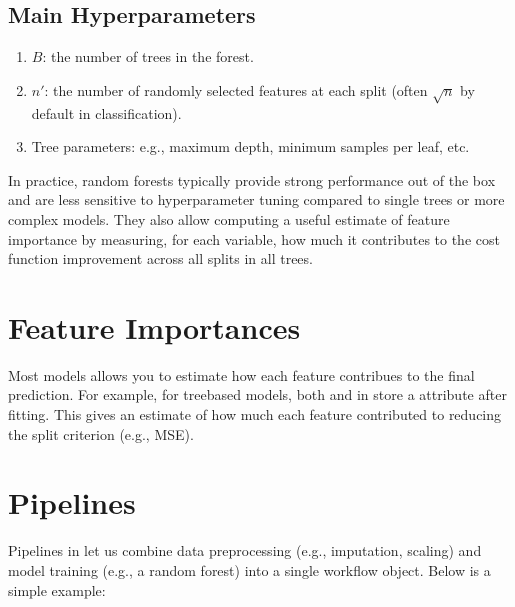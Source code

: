 \documentclass[letterpaper,10pt,english]{jupyterBook}
\begin{document}
\subsection{Main Hyperparameters}
\label{\detokenize{03:main-hyperparameters}}\begin{enumerate}
%
\item {} 
\sphinxAtStartPar
\(B\): the number of trees in the forest.

\item {} 
\sphinxAtStartPar
\(n'\): the number of randomly selected features at each split (often \(\sqrt{n}\) by default in classification).

\item {} 
\sphinxAtStartPar
Tree parameters: e.g., maximum depth, minimum samples per leaf, etc.

\end{enumerate}

\sphinxAtStartPar
In practice, random forests typically provide strong performance out of the box and are less sensitive to hyperparameter tuning compared to single trees or more complex models. They also allow computing a useful estimate of feature importance by measuring, for each variable, how much it contributes to the cost function improvement across all splits in all trees.


\section{Feature Importances}
\label{\detokenize{03:feature-importances}}
\sphinxAtStartPar
Most  models allows you to estimate how each feature contribues to the final prediction. For example, for tree\sphinxhyphen{}based models, both  and  in  store a  attribute after fitting. This gives an estimate of how much each feature contributed to reducing the split criterion (e.g., MSE).


\section{ Pipelines}
\label{\detokenize{03:scikit-learn-pipelines}}
\sphinxAtStartPar
Pipelines in  let us combine data preprocessing (e.g., imputation, scaling) and model training (e.g., a random forest) into a single workflow object. Below is a simple example:
\end{document}
